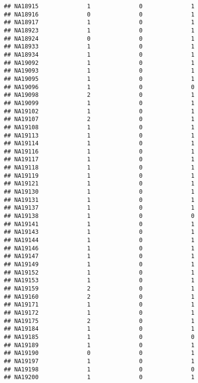 \documentclass[]{article}
\begin{document}
\begin{verbatim}
## NA18915              1              0              1
## NA18916              0              0              1
## NA18917              1              0              1
## NA18923              1              0              1
## NA18924              0              0              1
## NA18933              1              0              1
## NA18934              1              0              1
## NA19092              1              0              1
## NA19093              1              0              1
## NA19095              1              0              1
## NA19096              1              0              0
## NA19098              2              0              1
## NA19099              1              0              1
## NA19102              1              0              1
## NA19107              2              0              1
## NA19108              1              0              1
## NA19113              1              0              1
## NA19114              1              0              1
## NA19116              1              0              1
## NA19117              1              0              1
## NA19118              1              0              1
## NA19119              1              0              1
## NA19121              1              0              1
## NA19130              1              0              1
## NA19131              1              0              1
## NA19137              1              0              1
## NA19138              1              0              0
## NA19141              1              0              1
## NA19143              1              0              1
## NA19144              1              0              1
## NA19146              1              0              1
## NA19147              1              0              1
## NA19149              1              0              1
## NA19152              1              0              1
## NA19153              1              0              1
## NA19159              2              0              1
## NA19160              2              0              1
## NA19171              1              0              1
## NA19172              1              0              1
## NA19175              2              0              1
## NA19184              1              0              1
## NA19185              1              0              0
## NA19189              1              0              1
## NA19190              0              0              1
## NA19197              1              0              1
## NA19198              1              0              0
## NA19200              1              0              1

\end{verbatim}
\end{document}
